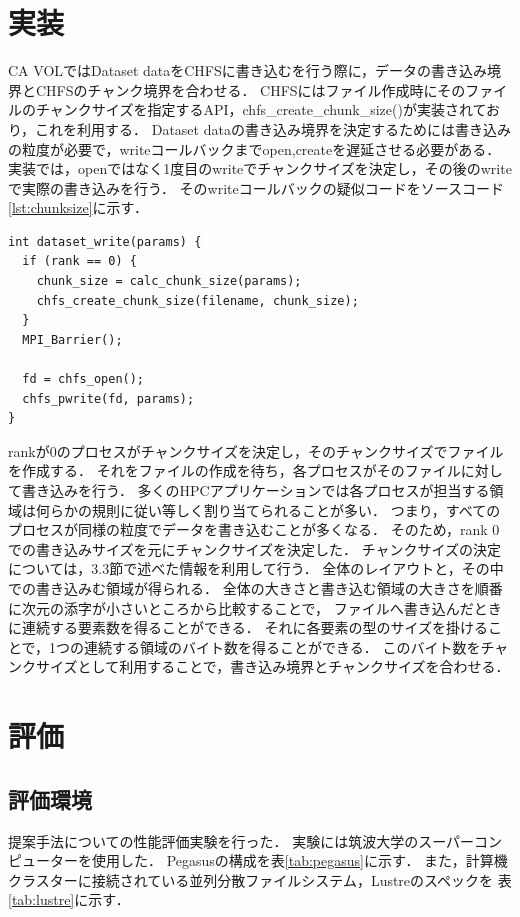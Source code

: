 \documentclass[submit,techrep,noauthor]{ipsj}
\begin{document}
\section{実装}
CA VOLではDataset dataをCHFSに書き込むを行う際に，データの書き込み境界とCHFSのチャンク境界を合わせる．
CHFSにはファイル作成時にそのファイルのチャンクサイズを指定するAPI，chfs\_create\_chunk\_size()が実装されており，これを利用する．
Dataset dataの書き込み境界を決定するためには書き込みの粒度が必要で，writeコールバックまでopen,createを遅延させる必要がある．
実装では，openではなく1度目のwriteでチャンクサイズを決定し，その後のwriteで実際の書き込みを行う．
そのwriteコールバックの疑似コードをソースコード\ref{lst:chunksize}に示す．
\begin{lstlisting}[caption=チャンクサイズの決定,label=lst:chunksize]
int dataset_write(params) {
  if (rank == 0) {
    chunk_size = calc_chunk_size(params);
    chfs_create_chunk_size(filename, chunk_size);
  }
  MPI_Barrier();

  fd = chfs_open();
  chfs_pwrite(fd, params);
}
\end{lstlisting}
rankが0のプロセスがチャンクサイズを決定し，そのチャンクサイズでファイルを作成する．
それをファイルの作成を待ち，各プロセスがそのファイルに対して書き込みを行う．
多くのHPCアプリケーションでは各プロセスが担当する領域は何らかの規則に従い等しく割り当てられることが多い．
つまり，すべてのプロセスが同様の粒度でデータを書き込むことが多くなる．
そのため，rank 0での書き込みサイズを元にチャンクサイズを決定した．
チャンクサイズの決定については，3.3節で述べた情報を利用して行う．
全体のレイアウトと，その中での書き込みむ領域が得られる．
全体の大きさと書き込む領域の大きさを順番に次元の添字が小さいところから比較することで，
ファイルへ書き込んだときに連続する要素数を得ることができる．
それに各要素の型のサイズを掛けることで，1つの連続する領域のバイト数を得ることができる．
このバイト数をチャンクサイズとして利用することで，書き込み境界とチャンクサイズを合わせる．


\section{評価}
\subsection{評価環境}
提案手法についての性能評価実験を行った．
実験には筑波大学のスーパーコンピューター\cite{ccs2022pegasus}を使用した．
Pegasusの構成を表\ref{tab:pegasus}に示す．
また，計算機クラスターに接続されている並列分散ファイルシステム，Lustreのスペックを
表\ref{tab:lustre}に示す．
\end{document}
